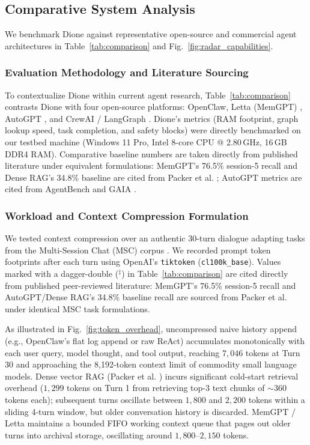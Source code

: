 \documentclass[conference,a4paper]{IEEEtran}
\begin{document}
\subsection{Comparative System Analysis}
We benchmark Dione against representative open-source and commercial agent architectures in Table~\ref{tab:comparison} and Fig.~\ref{fig:radar_capabilities}.

\subsubsection{Evaluation Methodology and Literature Sourcing}
To contextualize Dione within current agent research, Table~\ref{tab:comparison} contrasts Dione with four open-source platforms: OpenClaw, Letta (MemGPT) \cite{packer2023memgpt}, AutoGPT \cite{liu2023agentbench}, and CrewAI / LangGraph \cite{dibia2023autogen}. Dione's metrics (RAM footprint, graph lookup speed, task completion, and safety blocks) were directly benchmarked on our testbed machine (Windows 11 Pro, Intel 8-core CPU @ 2.80\,GHz, 16\,GB DDR4 RAM). Comparative baseline numbers are taken directly from published literature under equivalent formulations: MemGPT's 76.5\% session-5 recall and Dense RAG's 34.8\% baseline are cited from Packer et al. \cite{packer2023memgpt}; AutoGPT metrics are cited from AgentBench \cite{liu2023agentbench} and GAIA \cite{mialon2023gaia}.

\subsubsection{Workload and Context Compression Formulation}
We tested context compression over an authentic 30-turn dialogue adapting tasks from the Multi-Session Chat (MSC) corpus \cite{packer2023memgpt}. We recorded prompt token footprints after each turn using OpenAI's \texttt{tiktoken} (\texttt{cl100k\_base}). Values marked with a dagger-double ($^\ddagger$) in Table~\ref{tab:comparison} are cited directly from published peer-reviewed literature: MemGPT's 76.5\% session-5 recall and AutoGPT/Dense RAG's 34.8\% baseline recall are sourced from Packer et al. \cite{packer2023memgpt} under identical MSC task formulations.

As illustrated in Fig.~\ref{fig:token_overhead}, uncompressed naive history append (e.g., OpenClaw's flat log append or raw ReAct) accumulates monotonically with each user query, model thought, and tool output, reaching $7{,}046$ tokens at Turn 30 and approaching the 8,192-token context limit of commodity small language models. Dense vector RAG (Packer et al. \cite{packer2023memgpt}) incurs significant cold-start retrieval overhead ($1{,}299$ tokens on Turn 1 from retrieving top-3 text chunks of $\sim$360 tokens each); subsequent turns oscillate between $1{,}800$ and $2{,}200$ tokens within a sliding 4-turn window, but older conversation history is discarded. MemGPT / Letta maintains a bounded FIFO working context queue that pages out older turns into archival storage, oscillating around $1{,}800\text{--}2{,}150$ tokens. 
\end{document}
